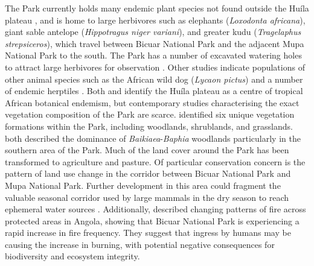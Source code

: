 \begin{refsection}
The Park currently holds many endemic plant species not found outside the Hu\'{i}la plateau \citep{Huntley2019}, and is home to large herbivores such as elephants (\textit{Loxodonta africana}), giant sable antelope (\textit{Hippotragus niger variani}), and greater kudu (\textit{Tragelaphus strepsiceros}), which travel between Bicuar National Park and the adjacent Mupa National Park to the south. The Park has a number of excavated watering holes to attract large herbivores for observation \citep{Simoes1971}. Other studies indicate populations of other animal species such as the African wild dog (\textit{Lycaon pictus}) \citep{Beja2019, Overton2016} and a number of endemic herptiles \citep{Baptista2019}. Both \citet{Linder2001} and \citet{Droissart2018} identify the Hu\'{i}la plateau as a centre of tropical African botanical endemism, but contemporary studies characterising the exact vegetation composition of the Park are scarce. \citet{Teixeira1968} identified six unique vegetation formations within the Park, including woodlands, shrublands, and grasslands. \citet{Barbosa1970, Chisingui2018} both described the dominance of \textit{Baikiaea}-\textit{Baphia} woodlands particularly in the southern area of the Park. Much of the land cover around the Park has been transformed to agriculture and pasture. Of particular conservation concern is the pattern of land use change in the corridor between Bicuar National Park and Mupa National Park. Further development in this area could fragment the valuable seasonal corridor used by large mammals in the dry season to reach ephemeral water sources \citep{Overton2016}. Additionally, \citet{Catarino2020} described changing patterns of fire across protected areas in Angola, showing that Bicuar National Park is experiencing a rapid increase in fire frequency. They suggest that ingress by humans may be causing the increase in burning, with potential negative consequences for biodiversity and ecosystem integrity. 

\begin{figure}[tb]
	\hfil


\end{figure}
\end{refsection}
